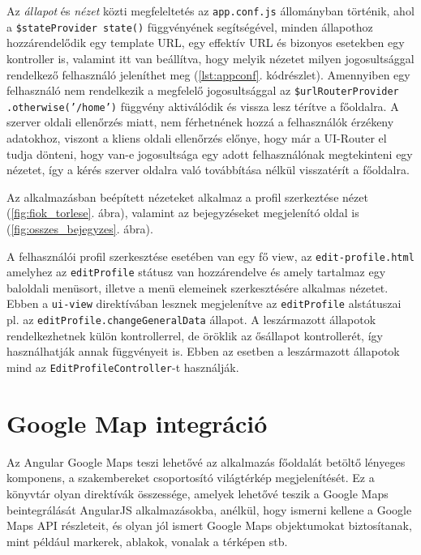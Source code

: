 Az \textit{állapot} és \textit{nézet} közti megfeleltetés az \texttt{app.conf.js} állományban történik, ahol a \texttt{\$stateProvider state()} függvényének segítségével, minden állapothoz hozzárendelődik egy template URL, egy effektív URL és bizonyos esetekben egy kontroller is, valamint itt van beállítva, hogy melyik nézetet milyen jogosultsággal rendelkező felhasználó jeleníthet meg (\ref{lst:appconf}. kódrészlet). Amennyiben egy felhasználó nem rendelkezik a megfelelő jogosultsággal az \texttt{\$urlRouterProvider} \texttt{.otherwise('/home')} függvény aktiválódik és vissza lesz térítve a főoldalra. A szerver oldali ellenőrzés miatt, nem férhetnének hozzá a felhasználók érzékeny adatokhoz, viszont a kliens oldali ellenőrzés előnye, hogy már a UI-Router el tudja dönteni, hogy van-e jogosultsága egy adott felhasználónak megtekinteni egy nézetet, így a kérés szerver oldalra való továbbítása nélkül visszatérít a főoldalra.

Az alkalmazásban beépített nézeteket alkalmaz a profil szerkeztése nézet (\ref{fig:fiok_torlese}. ábra), valamint az bejegyzéseket megjelenító oldal is (\ref{fig:osszes_bejegyzes}. ábra).

A felhasználói profil szerkesztése esetében van egy fő view, az \texttt{edit-profile.html} amelyhez az \texttt{editProfile} státusz van hozzárendelve és amely tartalmaz egy baloldali menüsort, illetve a menü elemeinek szerkesztésére alkalmas nézetet. Ebben a \texttt{ui-view} direktívában lesznek megjelenítve az \texttt{editProfile} alstátuszai pl. az \texttt{editProfile.changeGeneralData} állapot. A leszármazott állapotok rendelkezhetnek külön kontrollerrel, de öröklik az ősállapot kontrollerét, így használhatják annak függvényeit is. Ebben az esetben a leszármazott állapotok mind az \texttt{EditProfileController}-t használják. 




\section{Google Map integráció}
\label{sec:googleMap}


Az Angular Google Maps teszi lehetővé az alkalmazás főoldalát betöltő lényeges komponens, a szakembereket csoportosító világtérkép megjelenítését. Ez a könyvtár olyan direktívák összessége, amelyek lehetővé teszik a Google Maps beintegrálását AngularJS alkalmazásokba, anélkül, hogy ismerni kellene a Google Maps API részleteit, és olyan jól ismert Google Maps objektumokat biztosítanak, mint például markerek, ablakok, vonalak a térképen stb. \cite{AngularGoogleMap}

